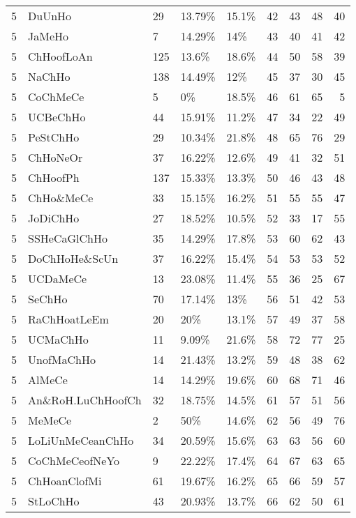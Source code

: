 \begin{longtable}{lllllrrrr}
  5 & DuUnHo & 29 & 13.79\% & 15.1\% &  42 &  43 &  48 &  40 \\ 
  5 & JaMeHo & 7 & 14.29\% & 14\% &  43 &  40 &  41 &  42 \\ 
  5 & ChHoofLoAn & 125 & 13.6\% & 18.6\% &  44 &  50 &  58 &  39 \\ 
  5 & NaChHo & 138 & 14.49\% & 12\% &  45 &  37 &  30 &  45 \\ 
  5 & CoChMeCe & 5 & 0\% & 18.5\% &  46 &  61 &  65 &   5 \\ 
  5 & UCBeChHo & 44 & 15.91\% & 11.2\% &  47 &  34 &  22 &  49 \\ 
  5 & PeStChHo & 29 & 10.34\% & 21.8\% &  48 &  65 &  76 &  29 \\ 
  5 & ChHoNeOr & 37 & 16.22\% & 12.6\% &  49 &  41 &  32 &  51 \\ 
  5 & ChHoofPh & 137 & 15.33\% & 13.3\% &  50 &  46 &  43 &  48 \\ 
  5 & ChHo\&MeCe & 33 & 15.15\% & 16.2\% &  51 &  55 &  55 &  47 \\ 
  5 & JoDiChHo & 27 & 18.52\% & 10.5\% &  52 &  33 &  17 &  55 \\ 
  5 & SSHeCaGlChHo & 35 & 14.29\% & 17.8\% &  53 &  60 &  62 &  43 \\ 
  5 & DoChHoHe\&ScUn & 37 & 16.22\% & 15.4\% &  54 &  53 &  53 &  52 \\ 
  5 & UCDaMeCe & 13 & 23.08\% & 11.4\% &  55 &  36 &  25 &  67 \\ 
  5 & SeChHo & 70 & 17.14\% & 13\% &  56 &  51 &  42 &  53 \\ 
  5 & RaChHoatLeEm & 20 & 20\% & 13.1\% &  57 &  49 &  37 &  58 \\ 
  5 & UCMaChHo & 11 & 9.09\% & 21.6\% &  58 &  72 &  77 &  25 \\ 
  5 & UnofMaChHo & 14 & 21.43\% & 13.2\% &  59 &  48 &  38 &  62 \\ 
  5 & AlMeCe & 14 & 14.29\% & 19.6\% &  60 &  68 &  71 &  46 \\ 
  5 & An\&RoH.LuChHoofCh & 32 & 18.75\% & 14.5\% &  61 &  57 &  51 &  56 \\ 
  5 & MeMeCe & 2 & 50\% & 14.6\% &  62 &  56 &  49 &  76 \\ 
  5 & LoLiUnMeCeanChHo & 34 & 20.59\% & 15.6\% &  63 &  63 &  56 &  60 \\ 
  5 & CoChMeCeofNeYo & 9 & 22.22\% & 17.4\% &  64 &  67 &  63 &  65 \\ 
  5 & ChHoanClofMi & 61 & 19.67\% & 16.2\% &  65 &  66 &  59 &  57 \\ 
  5 & StLoChHo & 43 & 20.93\% & 13.7\% &  66 &  62 &  50 &  61 \\ 

\end{longtable}
